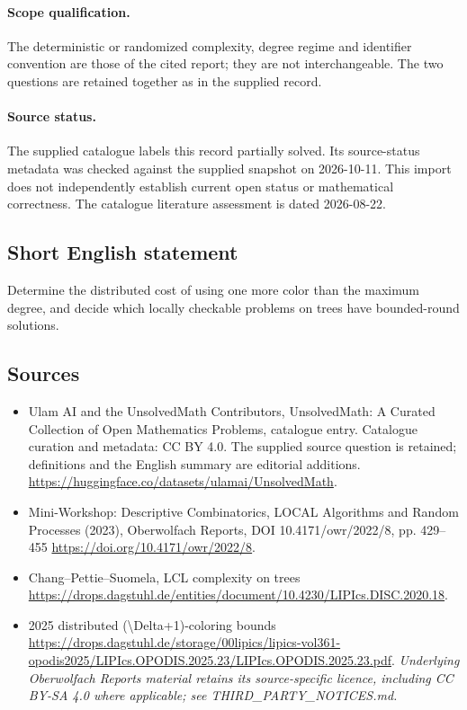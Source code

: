 \documentclass[11pt]{article}
\begin{document}
\paragraph{Scope qualification.}
The deterministic or randomized complexity, degree regime and identifier convention are those of the cited report; they are not interchangeable. The two questions are retained together as in the supplied record.
\paragraph{Source status.}
The supplied catalogue labels this record partially solved. Its source-status metadata was checked against the supplied snapshot on 2026-10-11. This import does not independently establish current open status or mathematical correctness. The catalogue literature assessment is dated 2026-08-22.
\subsection{Short English statement}
Determine the distributed cost of using one more color than the maximum degree, and decide which locally checkable problems on trees have bounded-round solutions.
\subsection{Sources}
\begin{itemize}
\item[S1] Ulam AI and the UnsolvedMath Contributors, UnsolvedMath: A Curated Collection of Open Mathematics Problems, catalogue entry. Catalogue curation and metadata: CC BY 4.0. The supplied source question is retained; definitions and the English summary are editorial additions.
\url{https://huggingface.co/datasets/ulamai/UnsolvedMath}.
\item[S2] Mini-Workshop: Descriptive Combinatorics, LOCAL Algorithms and Random Processes (2023), Oberwolfach Reports, DOI 10.4171/owr/2022/8, pp. 429--455
\url{https://doi.org/10.4171/owr/2022/8}.
\item[S3] Chang--Pettie--Suomela, LCL complexity on trees
\url{https://drops.dagstuhl.de/entities/document/10.4230/LIPIcs.DISC.2020.18}.
\item[S4] 2025 distributed (\textbackslash{}Delta+1)-coloring bounds
\url{https://drops.dagstuhl.de/storage/00lipics/lipics-vol361-opodis2025/LIPIcs.OPODIS.2025.23/LIPIcs.OPODIS.2025.23.pdf}.
\textit{Underlying Oberwolfach Reports material retains its source-specific licence, including CC BY-SA 4.0 where applicable; see THIRD\_PARTY\_NOTICES.md.}
\end{itemize}
\end{document}
